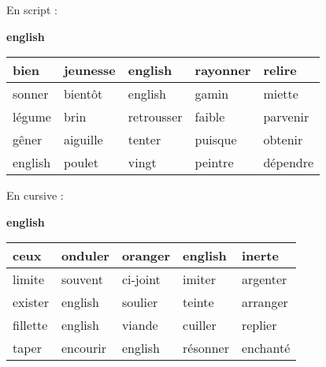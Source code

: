 \documentclass[a4paper, 11pt,oneside, fleqn]{article}
\begin{document}
\begin{onehalfspace}
\large\noindent En script :
\begin{center} {\huge \textbf{english}}
\vspace{0.25cm}\\
\begin{tabulary}{17cm}{|h|h|h|h|h|}
\hline
bien & jeunesse & english & rayonner & relire \\
\hline
sonner & bientôt & english & gamin & miette \\
\hline
légume & brin & retrousser & faible & parvenir \\
\hline
gêner & aiguille & tenter & puisque & obtenir \\
\hline
english & poulet & vingt & peintre & dépendre \\
\hline
\end{tabulary}
\end{center}
\vspace{0.5cm}

\large\noindent En cursive :
\begin{center}
{\huge \textbf {{\cursive english}}}
\vspace{0.25cm}\\
\begin{tabulary}{17cm}{|i|i|i|i|i|}
\hline
ceux & onduler & oranger & english & inerte \\
\hline
limite & souvent & ci-joint & imiter & argenter \\
\hline
exister & english & soulier & teinte & arranger \\
\hline
fillette & english & viande & cuiller & replier \\
\hline
taper & encourir & english & résonner & enchanté \\
\hline
\end{tabulary}
\end{center}

\end{onehalfspace}
\end{document}

